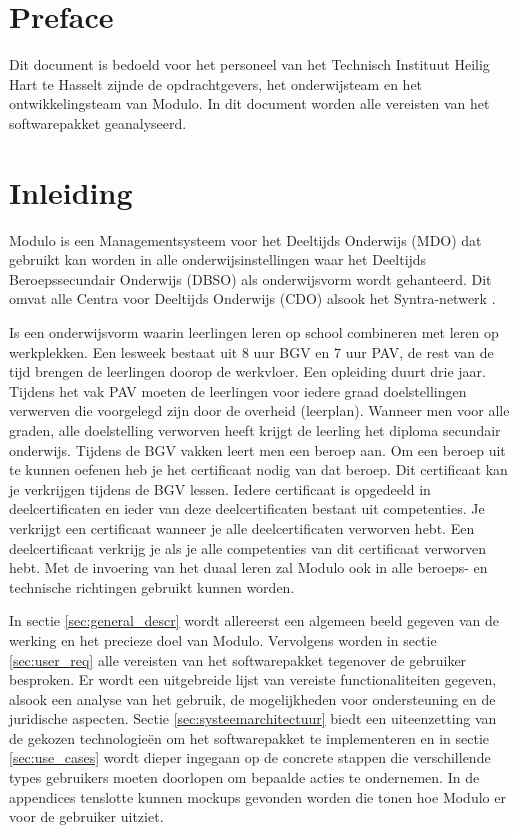 \documentclass[a4paper]{article}
\begin{document}


\tableofcontents
\newpage

\section{Preface}
Dit document is bedoeld voor het personeel van het Technisch Instituut Heilig Hart te Hasselt \cite{TIHH} zijnde de opdrachtgevers, het onderwijsteam en het ontwikkelingsteam van Modulo. In dit document worden alle vereisten van het softwarepakket geanalyseerd.


\section{Inleiding}
Modulo is een Managementsysteem voor het Deeltijds Onderwijs (MDO) dat gebruikt kan worden in alle onderwijsinstellingen waar het Deeltijds Beroepssecundair Onderwijs (DBSO) \cite{DBSO} als onderwijsvorm wordt gehanteerd. Dit omvat alle Centra voor Deeltijds Onderwijs (CDO) \cite{CDO} alsook het Syntra-netwerk \cite{Syntra}.

Is een onderwijsvorm waarin leerlingen leren op school combineren met leren op werkplekken.  Een lesweek bestaat uit 8 uur BGV en 7 uur PAV, de rest van de tijd brengen de leerlingen doorop de werkvloer. Een opleiding duurt drie jaar. Tijdens het vak PAV moeten de leerlingen voor iedere graad doelstellingen verwerven die voorgelegd zijn door de overheid (leerplan). Wanneer men voor alle graden, alle doelstelling verworven heeft krijgt de leerling het diploma secundair onderwijs. Tijdens de BGV vakken leert men een beroep aan. Om een beroep uit te kunnen oefenen heb je het certificaat nodig van dat beroep. Dit certificaat kan je verkrijgen tijdens de BGV lessen. Iedere certificaat is opgedeeld in deelcertificaten en ieder van deze deelcertificaten bestaat uit competenties. Je verkrijgt een certificaat wanneer je alle deelcertificaten verworven hebt. Een deelcertificaat verkrijg je als je alle competenties van dit certificaat verworven hebt. Met de invoering van het duaal leren \cite{Duaal_leren} zal Modulo ook in alle beroeps- en technische richtingen gebruikt kunnen worden. 

In sectie \ref{sec:general_descr} wordt allereerst een algemeen beeld gegeven van de werking en het precieze doel van Modulo. Vervolgens worden in sectie \ref{sec:user_req} alle vereisten van het softwarepakket tegenover de gebruiker besproken. Er wordt een uitgebreide lijst van vereiste functionaliteiten gegeven, alsook een analyse van het gebruik, de mogelijkheden voor ondersteuning en de juridische aspecten. Sectie \ref{sec:systeemarchitectuur} biedt een uiteenzetting van de gekozen technologieën om het softwarepakket te implementeren en in sectie \ref{sec:use_cases} wordt dieper ingegaan op de concrete stappen die verschillende types gebruikers moeten doorlopen om bepaalde acties te ondernemen. In de appendices tenslotte kunnen mockups gevonden worden die tonen hoe Modulo er voor de gebruiker uitziet.
\end{document}
